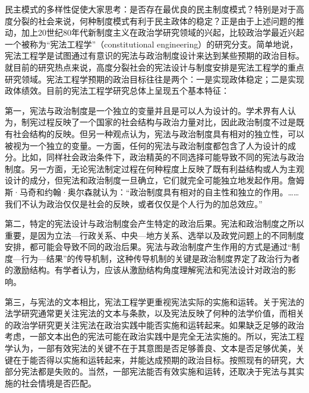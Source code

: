 民主模式的多样性促使大家思考：是否存在最优良的民主制度模式？特别是对于高度分裂的社会来说，何种制度模式有利于民主政体的稳定？正是由于上述问题的推动，加上20世纪80年代新制度主义在政治学研究领域的兴起，比较政治学最近兴起一个被称为“宪法工程学”（constitutional engineering）的研究分支。简单地说，宪法工程学是试图通过有意识的宪法与政治制度设计来达到某些预期的政治目标。就目前的研究热点来说，高度分裂社会的宪法设计与制度安排是宪法工程学的重点研究领域。宪法工程学预期的政治目标往往是两个：一是实现政体稳定；二是实现政体绩效。目前的宪法工程学研究总体上呈现五个基本特征：

第一，宪法与政治制度是一个独立的变量并且是可以人为设计的。学术界有人认为，制宪过程反映了一个国家的社会结构与政治力量对比，因此政治制度不过是既有社会结构的反映。但另一种观点认为，宪法与政治制度具有相对的独立性，可以被视为一个独立的变量。一方面，任何的宪法与政治制度都包含了人为设计的成分。比如，同样社会政治条件下，政治精英的不同选择可能导致不同的宪法与政治制度。另一方面，无论宪法制定过程在何种程度上反映了既有利益结构或人为主观设计的成分，但宪法和政治制度一旦确立，它们就完全可能独立地发起作用。詹姆斯·马奇和约翰·奥尔森就认为：“政治制度具有相对的自主性和独立的作用。……我们不认为政治仅仅是社会的反映，或者仅仅是个人行为的加总效应。”

第二，特定的宪法设计与政治制度会产生特定的政治后果。宪法和政治制度之所以重要，是因为立法—行政关系、中央—地方关系、选举以及政党问题上的不同制度安排，都可能会导致不同的政治后果。宪法与政治制度产生作用的方式是通过“制度—行为—结果”的传导机制，这种传导机制的关键是政治制度界定了政治行为者的激励结构。有学者认为，应该从激励结构角度理解宪法和宪法设计对政治的影响。

第三，与宪法的文本相比，宪法工程学更重视宪法实际的实施和运转。关于宪法的法学研究通常更关注宪法的文本与条款，以及宪法反映了何种的法学价值，而相关的政治学研究更关注宪法在政治实践中能否实施和运转起来。如果缺乏足够的政治考虑，一部文本出色的宪法可能在政治实践中是完全无法实施的。所以，宪法工程学认为，一部有效宪法的关键不在于其意图是否足够善良、文本是否足够优美，关键在于能否得以实施和运转起来，并能达成预期的政治目标。按照现有的研究，大部分宪法都是失败的。当然，一部宪法能否有效实施和运转，还取决于宪法与其实施的社会情境是否匹配。

